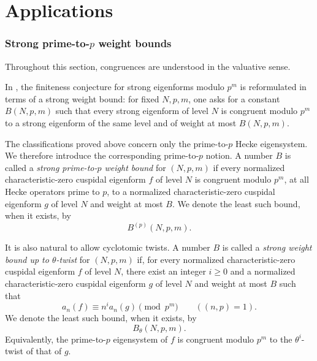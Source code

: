 \documentclass[11pt]{article}
\theoremstyle{plain}
\theoremstyle{definition}
\theoremstyle{remark}
\numberwithin{equation}{section}
\begin{document}
\part{Applications}

\section{Strong prime-to-\texorpdfstring{\(p\)}{p} weight bounds}
\label{sec:strong-weight-bounds}

Throughout this section, congruences are understood in the valuative sense.

In \cite[\S1.5]{KRW2016}, the finiteness conjecture for strong eigenforms modulo \(p^m\) is reformulated in terms of a strong weight bound: for fixed \(N,p,m\), one asks for a constant \(B(N,p,m)\) such that every strong eigenform of level \(N\) is congruent modulo \(p^m\) to a strong eigenform of the same level and of weight at most \(B(N,p,m)\).

The classifications proved above concern only the prime-to-\(p\) Hecke eigensystem. We therefore introduce the corresponding prime-to-\(p\) notion. A number \(B\) is called a \emph{strong prime-to-\(p\) weight bound} for \((N,p,m)\) if every normalized characteristic-zero cuspidal eigenform \(f\) of level \(N\) is congruent modulo \(p^m\), at all Hecke operators prime to \(p\), to a normalized characteristic-zero cuspidal eigenform \(g\) of level \(N\) and weight at most \(B\). We denote the least such bound, when it exists, by \[ B^{(p)}(N,p,m). \] 

It is also natural to allow cyclotomic twists. A number \(B\) is called a \emph{strong weight bound up to \(\theta\)-twist} for \((N,p,m)\) if, for every normalized characteristic-zero cuspidal eigenform \(f\) of level \(N\), there exist an integer \(i\geq0\) and a normalized characteristic-zero cuspidal eigenform \(g\) of level \(N\) and weight at most \(B\) such that \[ a_n(f)\equiv n^i a_n(g)\pmod{p^m} \qquad ((n,p)=1). \] We denote the least such bound, when it exists, by \[ B_\theta(N,p,m). \] Equivalently, the prime-to-\(p\) eigensystem of \(f\) is congruent modulo \(p^m\) to the \(\theta^i\)-twist of that of \(g\).
\end{document}
